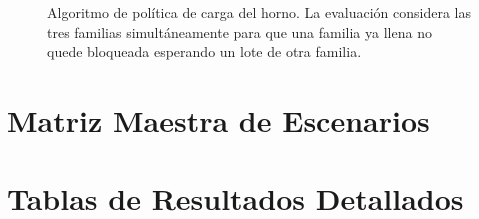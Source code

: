 \documentclass[10pt, a4paper]{article}
\begin{document}
\begin{figure}[H]
\caption{Algoritmo de pol\'itica de carga del horno. La evaluaci\'on
considera las tres familias simult\'aneamente para que una familia ya llena no
quede bloqueada esperando un lote de otra familia.}
\label{fig:carga_horno}
\end{figure}

\newpage

\section{Matriz Maestra de Escenarios}
\label{app:escenarios}


\newpage

\section{Tablas de Resultados Detallados}
\label{app:resultados}

\end{document}
